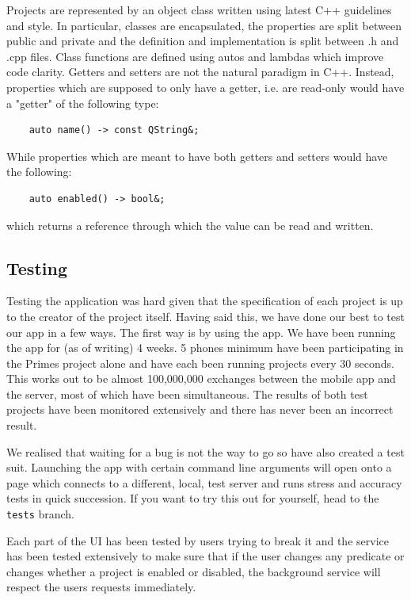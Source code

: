 \documentclass{article}
\begin{document}
Projects are represented by an object class written using latest C++ guidelines and style. In particular,
classes are encapsulated, the properties are split between public and private and the definition and implementation is split between .h and .cpp files. Class functions are defined using autos and lambdas which improve code clarity. Getters and setters are not the natural paradigm in C++. Instead, properties which are supposed to only have a getter, i.e. are read-only would have a "getter" of the following type:
\begin{verbatim}
    auto name() -> const QString&;
\end{verbatim}
While properties which are meant to have both getters and setters would have the following:
\begin{verbatim}
    auto enabled() -> bool&;
\end{verbatim}
which returns a reference through which the value can be read and written. 
\subsection{Testing}
Testing the application was hard given that the specification of each project is up to the creator of the project itself. Having said this,
we have done our best to test our app in a few ways. The first way is by using the app. We have been running the app for (as of writing)
4 weeks. 5 phones minimum have been participating in the Primes project alone and have each been running projects every 30 seconds.
This works out to be almost 100,000,000 exchanges between the mobile app and the server, most of which have been simultaneous. The results
of both test projects have been monitored extensively and there has never been an incorrect result.

We realised that waiting for a bug is not the way to go so have also created a test suit. Launching the app with certain command line
arguments will open onto a page which connects to a different, local, test server and runs stress and accuracy tests in quick succession.
If you want to try this out for yourself, head to the \texttt{tests} branch.

Each part of the UI has been tested by users trying to break it and the service has been tested extensively to make sure that if the user
changes any predicate or changes whether a project is enabled or disabled, the background service will respect the users requests immediately.
\end{document}
